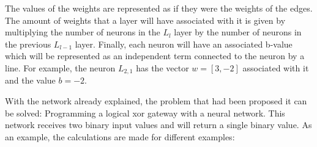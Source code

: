 The values of the weights are represented as if they were the weights of the edges. The amount of weights that a layer will have associated with it is given by multiplying the number of neurons in the $L_{l}$ layer by the number of neurons in the previous $L_{l-1}$ layer. Finally, each neuron will have an associated b-value which will be represented as an independent term connected to the neuron by a line. For example, the neuron $L_{2,1}$ has the vector $w = [3, -2]$ associated with it and the value $b = -2$.
\newline


With the network already explained, the problem that had been proposed it can be solved: Programming a logical \acrshort{xor} gateway with a neural network. This network receives two binary input values and will return a single binary value. As an example, the calculations are made for different examples:

